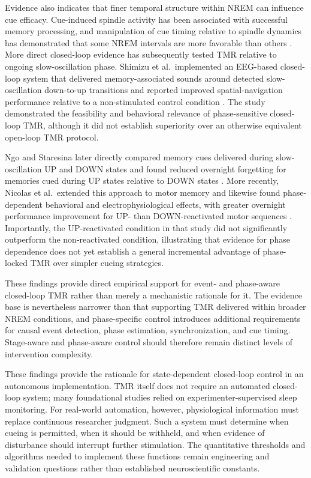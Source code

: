 Evidence also indicates that finer temporal structure within NREM can influence
cue efficacy. Cue-induced spindle activity has been associated with successful
memory processing, and manipulation of cue timing relative to spindle dynamics
has demonstrated that some NREM intervals are more favorable than others
\citep{cairney2018spindle,antony2018spindle}. More direct closed-loop evidence
has subsequently tested TMR relative to ongoing slow-oscillation phase.
Shimizu et al.\ implemented an EEG-based closed-loop system that delivered
memory-associated sounds around detected slow-oscillation down-to-up
transitions and reported improved spatial-navigation performance relative to a
non-stimulated control condition \citep{shimizu2018closedloop}. The study
demonstrated the feasibility and behavioral relevance of phase-sensitive
closed-loop TMR, although it did not establish superiority over an otherwise
equivalent open-loop TMR protocol.

Ngo and Staresina later directly compared memory cues delivered during
slow-oscillation UP and DOWN states and found reduced overnight forgetting for
memories cued during UP states relative to DOWN states
\citep{ngo2022shaping}. More recently, Nicolas et al.\ extended this approach
to motor memory and likewise found phase-dependent behavioral and
electrophysiological effects, with greater overnight performance improvement
for UP- than DOWN-reactivated motor sequences
\citep{nicolas2025phase}. Importantly, the UP-reactivated condition in that
study did not significantly outperform the non-reactivated condition,
illustrating that evidence for phase dependence does not yet establish a
general incremental advantage of phase-locked TMR over simpler cueing
strategies.

These findings provide direct empirical support for event- and phase-aware
closed-loop TMR rather than merely a mechanistic rationale for it. The evidence
base is nevertheless narrower than that supporting TMR delivered within broader
NREM conditions, and phase-specific control introduces additional requirements
for causal event detection, phase estimation, synchronization, and cue timing.
Stage-aware and phase-aware control should therefore remain distinct levels of
intervention complexity.

These findings provide the rationale for state-dependent closed-loop control in
an autonomous implementation. TMR itself does not require an automated
closed-loop system; many foundational studies relied on experimenter-supervised
sleep monitoring. For real-world automation, however, physiological information
must replace continuous researcher judgment. Such a system must determine when
cueing is permitted, when it should be withheld, and when evidence of disturbance
should interrupt further stimulation. The quantitative thresholds and algorithms
needed to implement these functions remain engineering and validation questions
rather than established neuroscientific constants.


